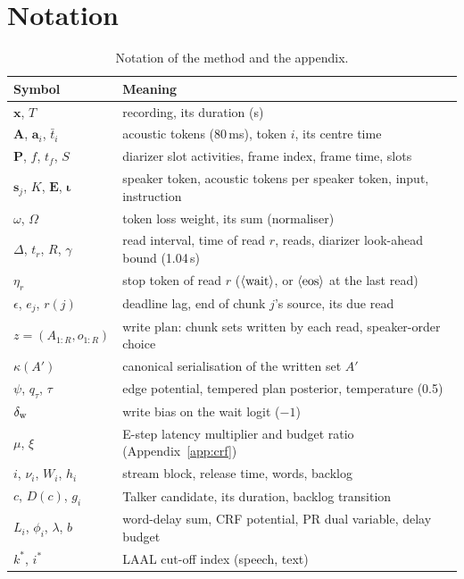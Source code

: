 
\section{Notation}
\label{app:notation}

\begin{table}[h]
\centering\footnotesize
\setlength{\tabcolsep}{3pt}
\begin{tabular}{@{}>{\raggedright\arraybackslash}p{2.2cm}>{\raggedright\arraybackslash}p{5.1cm}@{}}
\toprule
Symbol & Meaning \\
\midrule
$\bm{x}$, $T$ & recording, its duration (s) \\
$\bm{A}$, $\bm{a}_i$, $\bar{t}_i$ & acoustic tokens (80\,ms), token $i$, its centre time \\
$\bm{P}$, $f$, $t_f$, $S$ & diarizer slot activities, frame index, frame time, slots \\
$\bm{s}_j$, $K$, $\bm{E}$, $\bm{\iota}$ & speaker token, acoustic tokens per speaker token, input, instruction \\
$\omega$, $\Omega$ & token loss weight, its sum (normaliser) \\
$\Delta$, $t_r$, $R$, $\gamma$ & read interval, time of read $r$, reads, diarizer look-ahead bound (1.04\,s) \\
$\eta_r$ & stop token of read $r$ ($\langle\mathrm{wait}\rangle$, or $\langle\mathrm{eos}\rangle$ at the last read) \\
$\epsilon$, $e_j$, $r(j)$ & deadline lag, end of chunk $j$'s source, its due read \\
$z=(A_{1:R},o_{1:R})$ & write plan: chunk sets written by each read, speaker-order choice \\
$\kappa(A')$ & canonical serialisation of the written set $A'$ \\
$\psi$, $q_\tau$, $\tau$ & edge potential, tempered plan posterior, temperature (0.5) \\
$\delta_{\mathrm{w}}$ & write bias on the wait logit ($-1$) \\
$\mu$, $\xi$ & E-step latency multiplier and budget ratio (Appendix~\ref{app:crf}) \\
$i$, $\nu_i$, $W_i$, $h_i$ & stream block, release time, words, backlog \\
$c$, $D(c)$, $g_i$ & Talker candidate, its duration, backlog transition \\
$L_i$, $\phi_i$, $\lambda$, $b$ & word-delay sum, CRF potential, PR dual variable, delay budget \\
$k^\ast$, $i^\ast$ & LAAL cut-off index (speech, text) \\
\bottomrule
\end{tabular}
\caption{Notation of the method and the appendix.}
\label{tab:notation}
\end{table}

